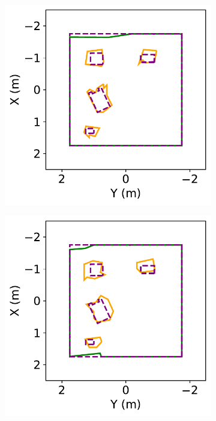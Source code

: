 \begin{figure}[!htb]
  \begin{subfigure}[t]{.30\linewidth}
    \centering  \includegraphics[clip,trim=0cm 0cm 0cm 0cm,width=.99\linewidth]{chapter_7_experiments/imgs/man_poly_1.pdf}
    \caption{\label{fig:ch7_man_poly_a}}
  \end{subfigure}
  \begin{subfigure}[t]{.30\linewidth}
    \centering  \includegraphics[clip,trim=0cm 0cm 0cm 0cm,width=.99\linewidth]{chapter_7_experiments/imgs/man_poly_3.pdf}

\end{subfigure}
\end{figure}
